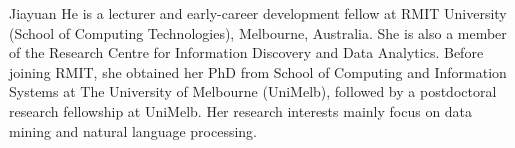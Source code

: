 \documentclass[10pt,journal,compsoc]{IEEEtran}
\begin{document}
\begin{IEEEbiography}{Jiayuan He}
is a lecturer and early-career development fellow at RMIT University (School of Computing Technologies), Melbourne, Australia. She is also a member of the Research Centre for Information Discovery and Data Analytics. Before joining RMIT, she obtained her PhD from School of Computing and Information Systems at The University of Melbourne (UniMelb), followed by a postdoctoral research fellowship at UniMelb. Her research interests mainly focus on data mining and natural language processing.
\end{IEEEbiography}








\end{document}
